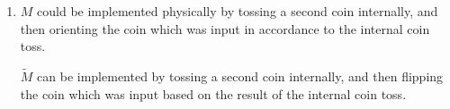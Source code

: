 \begin{enumerate}
\begin{gradedsolution}
\begin{enumerate}
	This is the expected outcome: The first model does not care about the input at all, and so if the ``randomness'' $w$ is the same in the actual, and the counterfactual world, then the outcome $y = y'$ is the same.
	However, the second model multiplies the ``randomness'' $w$ with the input $x$ or $x'$, and so if the input changes, the output also must change, and so we cannot have the outcome $y' = y$.

	\item $M$ could be implemented physically by tossing a second coin internally, and then orienting the coin which was input in accordance to the internal coin toss.

	$\tilde{M}$ can be implemented by tossing a second coin internally, and then flipping the coin which was input based on the result of the internal coin toss.


\end{enumerate}
\end{gradedsolution}
\end{enumerate}

